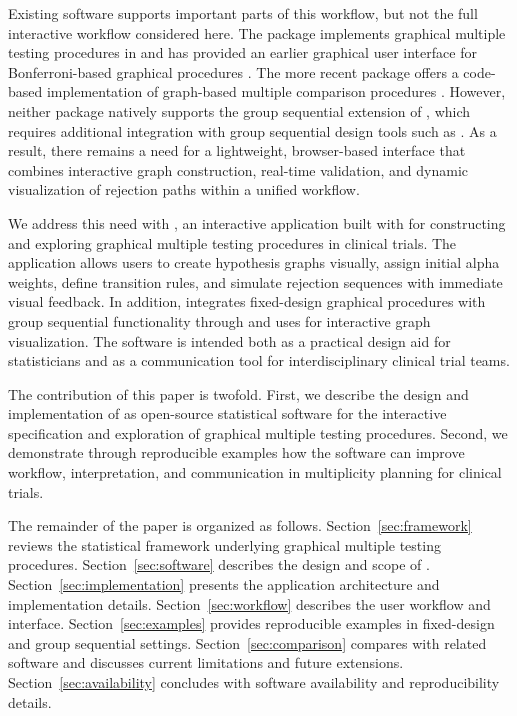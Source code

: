 \documentclass[article]{jss}
\begin{document}
Existing software supports important parts of this workflow, but not the full
interactive workflow considered here. The  package implements
graphical multiple testing procedures in  and has provided an
earlier graphical user interface for Bonferroni-based graphical procedures
\citep{Bretz2011,gMCP2024}. The more recent  package offers a
code-based implementation of graph-based multiple comparison procedures
\citep{graphicalMCP2024}. However, neither package natively supports the group
sequential extension of \citet{MaurerBretz2013}, which requires additional
integration with group sequential design tools such as 
\citep{gsDesign2024}. As a result, there remains a need for a lightweight,
browser-based interface that combines interactive graph construction, real-time
validation, and dynamic visualization of rejection paths within a unified
workflow.

We address this need with , an interactive 
application built with  \citep{shiny2024} for constructing and
exploring graphical multiple testing procedures in clinical trials. The
application allows users to create hypothesis graphs visually, assign initial
alpha weights, define transition rules, and simulate rejection sequences with
immediate visual feedback. In addition,  integrates fixed-design
graphical procedures with group sequential functionality through
 \citep{TrialSimulator2024} and uses
 \citep{visNetwork2023} for interactive graph visualization.
The software is intended both as a practical design aid for statisticians and
as a communication tool for interdisciplinary clinical trial teams.

The contribution of this paper is twofold. First, we describe the design and
implementation of  as open-source statistical software for the
interactive specification and exploration of graphical multiple testing
procedures. Second, we demonstrate through reproducible examples how the
software can improve workflow, interpretation, and communication in multiplicity
planning for clinical trials.

The remainder of the paper is organized as follows.
Section~\ref{sec:framework} reviews the statistical framework underlying
graphical multiple testing procedures. Section~\ref{sec:software} describes the
design and scope of . Section~\ref{sec:implementation} presents
the application architecture and implementation details.
Section~\ref{sec:workflow} describes the user workflow and interface.
Section~\ref{sec:examples} provides reproducible examples in fixed-design and
group sequential settings. Section~\ref{sec:comparison} compares
 with related software and discusses current limitations and
future extensions. Section~\ref{sec:availability} concludes with software
availability and reproducibility details.
\end{document}
